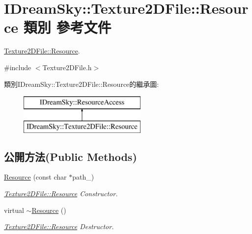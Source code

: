 \hypertarget{class_i_dream_sky_1_1_texture2_d_file_1_1_resource}{}\section{I\+Dream\+Sky\+:\+:Texture2\+D\+File\+:\+:Resource 類別 參考文件}
\label{class_i_dream_sky_1_1_texture2_d_file_1_1_resource}


\hyperlink{class_i_dream_sky_1_1_texture2_d_file_1_1_resource}{Texture2\+D\+File\+::\+Resource}.  




{\ttfamily \#include $<$Texture2\+D\+File.\+h$>$}

類別\+I\+Dream\+Sky\+:\+:Texture2\+D\+File\+:\+:Resource的繼承圖\+:\begin{figure}[H]
\begin{center}
\leavevmode
\includegraphics[height=2.000000cm]{class_i_dream_sky_1_1_texture2_d_file_1_1_resource}
\end{center}
\end{figure}
\subsection*{公開方法(Public Methods)}
\begin{DoxyCompactItemize}
\item 
\hyperlink{class_i_dream_sky_1_1_texture2_d_file_1_1_resource_ae2486e3440109fbc4039090233145f7e}{Resource} (const char $\ast$path\+\_\+)
\begin{DoxyCompactList}\small\item\em \hyperlink{class_i_dream_sky_1_1_texture2_d_file_1_1_resource}{Texture2\+D\+File\+::\+Resource} Constructor. \end{DoxyCompactList}\item 
virtual \hyperlink{class_i_dream_sky_1_1_texture2_d_file_1_1_resource_ad4893c973464e2f9db32a3952e137d2b}{$\sim$\+Resource} ()
\begin{DoxyCompactList}\small\item\em \hyperlink{class_i_dream_sky_1_1_texture2_d_file_1_1_resource}{Texture2\+D\+File\+::\+Resource} Destructor. \end{DoxyCompactList}\end{DoxyCompactItemize}
